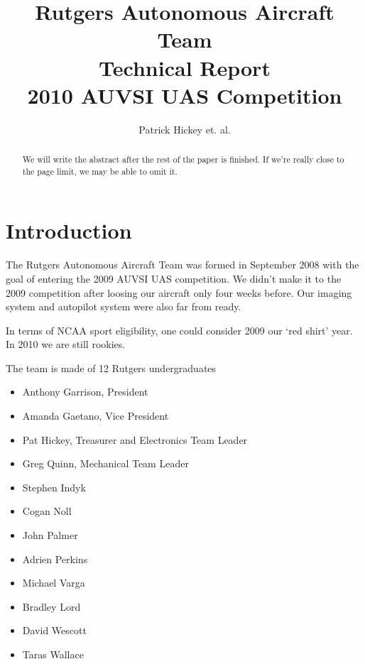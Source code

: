 \documentclass[10pt]{report}
\begin{document}
\title{Rutgers Autonomous Aircraft Team\\Technical Report\\2010 AUVSI UAS Competition}
\author{Patrick Hickey et. al.}


\begin{abstract}
We will write the abstract after the rest of the paper is finished. If we're really close to the page limit, we may be able to omit it.
\end{abstract}

\section{Introduction}

The Rutgers Autonomous Aircraft Team was formed in September 2008 with the goal of entering the 2009 AUVSI UAS competition. We didn't make it to the 2009 competition after loosing our aircraft only four weeks before. Our imaging system and autopilot system were also far from ready. 

In terms of NCAA sport eligibility, one could consider 2009 our `red shirt' year. In 2010 we are still rookies.

The team is made of 12 Rutgers undergraduates

\begin{multicols}{2}
\begin{itemize}
	\setlength{\itemsep}{0cm}
	\setlength{\parskip}{0cm}
	\item Anthony Garrison, President
	\item Amanda Gaetano, Vice President
	\item Pat Hickey, Treasurer and Electronics Team Leader
	\item Greg Quinn, Mechanical Team Leader
	\setlength{\itemsep}{0cm}
	\setlength{\parskip}{0cm}
	\item Stephen Indyk 
	\item Cogan Noll
	\item John Palmer 
	\item Adrien Perkins
	\item Michael Varga 
	\item Bradley Lord
	\item David Wescott
	\item Taras Wallace
\end{itemize}
\end{multicols}
\end{document}

